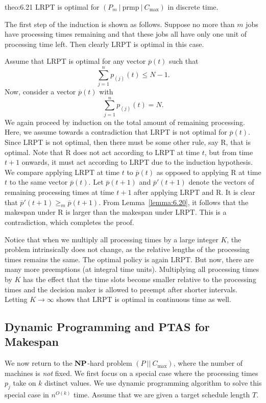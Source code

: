 \begin{theo}{theo:6.21}
    LRPT is optimal for $(P_m~|~\text{prmp}~|~C_{\max})$ in discrete time. 
\end{theo}
\begin{pf}
    The first step of the induction is shown as follows. Suppose no more than
    $m$ jobs have processing times remaining and that these jobs all have only 
    one unit of processing time left. Then clearly LRPT is optimal in this case.

    Assume that LRPT is optimal for any vector $\overline p(t)$ such that 
    \[ \sum_{j=1}^n p_{(j)}(t) \leq N-1. \] 
    Now, consider a vector $\overline p(t)$ with 
    \[ \sum_{j=1}^n p_{(j)}(t) = N. \] 
    We again proceed by induction on the total amount of remaining processing.
    Here, we assume towards a contradiction that LRPT is not optimal 
    for $\overline p(t)$. Since LRPT is not optimal, then there must be 
    some other rule, say R, that is optimal. Note that R does not act according to 
    LRPT at time $t$, but from time $t + 1$ onwards, it must act according to 
    LRPT due to the induction hypothesis. We compare applying LRPT at time 
    $t$ to $\overline p(t)$ as opposed to applying R at time $t$ to 
    the same vector $\overline p(t)$. Let $\overline p(t+1)$ and 
    $\overline p'(t+1)$ denote the vectors of remaining processing times 
    at time $t+1$ after applying LRPT and R. It is clear that 
    $\overline p'(t+1) \geq_m \overline p(t+1)$. From Lemma~\ref{lemma:6.20}, 
    it follows that the makespan under R is larger than the makespan under 
    LRPT. This is a contradiction, which completes the proof. 
\end{pf}

Notice that when we multiply all processing times by a large integer $K$,
the problem intrinsically does not change, as the relative lengths of the 
processing times remains the same. The optimal policy is again LRPT. But now, 
there are many more preemptions (at integral time units). Multiplying all 
processing times by $K$ has the effect that the time slots become smaller 
relative to the processing times and the decision maker is allowed to preempt 
after shorter intervals. Letting $K \to \infty$ shows that LRPT is optimal in 
continuous time as well. 

\subsection{Dynamic Programming and PTAS for Makespan} \label{subsec:6.3}
We now return to the $\operatorname{\textbf{NP}}$-hard problem $(P~||~C_{\max})$, where the 
number of machines is \emph{not} fixed. We first focus on a special 
case where the processing times $p_j$ take on $k$ distinct values. We use 
dynamic programming algorithm to solve this special case in $n^{O(k)}$ time. 
Assume that we are given a target schedule length $T$.

